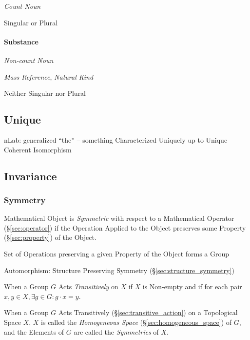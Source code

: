\emph{Count Noun}

Singular or Plural



\paragraph{Substance}\label{sec:substance}\hfill

\emph{Non-count Noun}

\emph{Mass Reference}, \emph{Natural Kind}

Neither Singular nor Plural



\subsection{Unique}\label{sec:unique}

nLab: generalized ``the'' -- something Characterized Uniquely up to
Unique Coherent Isomorphism %



\subsection{Invariance}\label{sec:invariance}

\subsubsection{Symmetry}\label{sec:symmetry}

Mathematical Object is \emph{Symmetric} with respect to a Mathematical
Operator (\S\ref{sec:operator}) if the Operation Applied to the Object
preserves some Property (\S\ref{sec:property}) of the Object.

Set of Operations preserving a given Property of the Object forms a
Group %

Automorphism: Structure Preserving Symmetry
(\S\ref{sec:structure_symmetry})

When a Group $G$ Acts \emph{Transitively} on $X$ if $X$ is Non-empty and if for
each pair $x,y \in X, \exists g \in G : g \cdot x = y$.

When a Group $G$ Acts Transitively (\S\ref{sec:transitive_action}) on a
Topological Space $X$, $X$ is called the \emph{Homogeneous Space}
(\S\ref{sec:homogeneous_space}) of $G$, and the Elements of $G$ are called the
\emph{Symmetries} of $X$.



